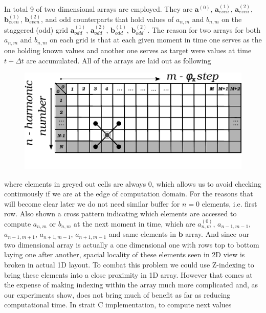 \documentclass[40pt,letterpaper,physrev]{article}
\begin{document}
    In total 9 of two dimensional arrays are employed. They are $\mathbf{a}^{(0)}$, $\mathbf{a}^{(1)}_{even}$, 
    $\mathbf{a}^{(2)}_{even}$, $\mathbf{b}^{(1)}_{even}$, $\mathbf{b}^{(2)}_{even}$, and odd counterparts that 
    hold values of $a_{n,m}$ and $b_{n,m}$ on the staggered (odd) grid $\mathbf{a}^{(1)}_{odd}$, 
    $\mathbf{a}^{(2)}_{odd}$, $\mathbf{b}^{(1)}_{odd}$, $\mathbf{b}^{(2)}_{odd}$. The reason for two arrays for 
    both $a_{n,m}$ and $b_{n,m}$ on each grid is that at each given moment in time one serves as the one holding 
    known values and another one serves as target were values at time $t+\Delta t$ are accumulated. All of the arrays 
    are laid out as following
    \begin{figure}[H]
   	  \centering
	  \normalsize %
	  \includegraphics[scale=1.2]{illustrations/array_layout.pdf}
	  \label{fig:array_layout}
	  \caption{}
	\end{figure}
	where elements in greyed out cells are always $0$, which allows us to avoid checking continuously if we are at the 
	edge of computation domain. For the reasons that will become clear later we do not need similar buffer for $n=0$ elements, 
	i.e. first row. Also shown a cross pattern indicating which elements are accessed to compute $a_{n,m}$ or $b_{n,m}$ at 
	the next moment in time, which are $a^{(0)}_{n,m}$, $a_{n-1,m-1}$, $a_{n-1,m+1}$, $a_{n+1,m-1}$, $a_{n+1,m-1}$ and 
	same elements in $\mathbf{b}$ array. And since our two dimensional array is actually a one dimensional one with rows 
	top to bottom laying one after another, spacial locality of these elements seen in 2D view is broken in actual 1D layout.
	To combat this problem we could use Z-indexing to bring these elements into a close proximity in 1D array. However that 
	comes at the expense of making indexing within the array much more complicated and, as our experiments show, does not 
	bring much of benefit as far as reducing computational time. In strait C implementation, to compute next values 
\end{document}
